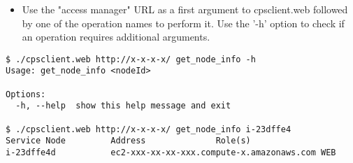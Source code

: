 \documentclass[12pt]{article}
\newenvironment{framedbox}[1]%
{\begin{framed}
 \begingroup
 \fontsize{#1}{#1}\selectfont
}
{
 \endgroup
 \end{framed}
}
\begin{document}
\begin{itemize}
\item Use the "access manager" URL as a first argument to cpsclient.web followed
      by one of the operation names to perform it. Use the '-h' option to check
      if an operation requires additional arguments.
\end{itemize}
\begin{framedbox}{8pt}\begin{verbatim}
$ ./cpsclient.web http://x-x-x-x/ get_node_info -h
Usage: get_node_info <nodeId>

Options:
  -h, --help  show this help message and exit

$ ./cpsclient.web http://x-x-x-x/ get_node_info i-23dffe4
Service Node         Address              Role(s)
i-23dffe4d           ec2-xxx-xx-xx-xxx.compute-x.amazonaws.com WEB
\end{verbatim}\end{framedbox}
\end{document}
